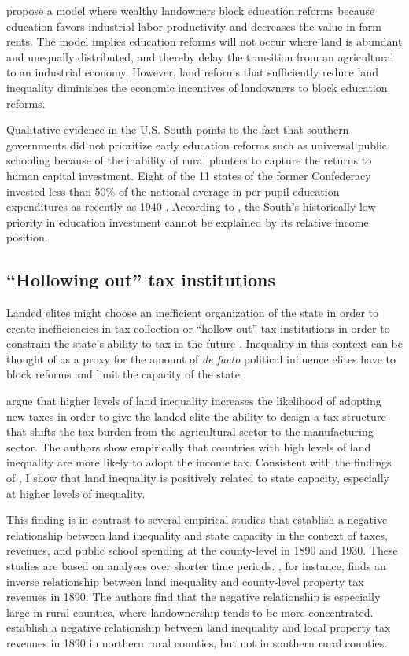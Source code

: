 \citet{galor2009inequality} propose a model where wealthy landowners block education reforms because education favors industrial labor productivity and decreases the value in farm rents. The model implies education reforms will not occur where land is abundant and unequally distributed, and thereby delay the transition from an agricultural to an industrial economy. However, land reforms that sufficiently reduce land inequality diminishes the economic incentives of landowners to block education reforms. 

Qualitative evidence in the U.S. South points to the fact that southern governments did not prioritize early education reforms such as universal public schooling because of the inability of rural planters to capture the returns to human capital investment. Eight of the 11 states of the former Confederacy invested less than 50\% of the national average in per-pupil education expenditures as recently as 1940 \citep{wright1986old}. According to \citet{wright1986old}, the South's historically low priority in education investment cannot be explained by its relative income position. 

\subsection{``Hollowing out'' tax institutions}
	
Landed elites might choose an inefficient organization of the state in order to create inefficiencies in tax collection \citep{acemoglu2011emergence} or ``hollow-out'' tax institutions in order to constrain the state's ability to tax in the future \citep{suryanarayan2017hollowing}. Inequality in this context can be thought of as a proxy for the amount of \emph{de facto} political influence elites have to block reforms and limit the capacity of the state \citep{acemoglu2008persistence}.

\citet{mares2015non} argue that higher levels of land inequality increases the likelihood of adopting new taxes in order to give the landed elite the ability to design a tax structure that shifts the tax burden from the agricultural sector to the manufacturing sector. The authors show empirically that countries with high levels of land inequality are more likely to adopt the income tax.  Consistent with the findings of \citet{mares2015non}, I show that land inequality is positively related to state capacity, especially at higher levels of inequality. 

This finding is in contrast to several empirical studies that establish a negative relationship between land inequality and state capacity in the context of taxes, revenues, and public school spending at the county-level in 1890 and 1930. These studies are based on analyses over shorter time periods. \citet{ramcharan2010inequality}, for instance, finds an inverse relationship between land inequality and county-level property tax revenues in 1890. The authors find that the negative relationship is especially large in rural counties, where landownership tends to be more concentrated. \citet{vollrath2013inequality} establish a negative relationship between land inequality and local property tax revenues in 1890 in northern rural counties, but not in southern rural counties. 

